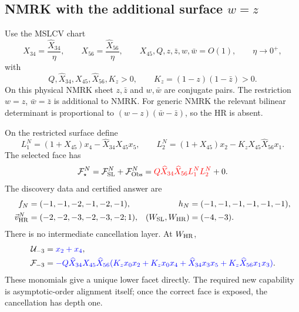 \documentclass[a4paper,11pt]{article}
\newcommand{\FSL}{\mathcal F_{\rm SL}}
\newcommand{\FObs}{\mathcal F_{\rm Obs}}
\newcommand{\WSL}{W_{\rm SL}}
\newcommand{\WHR}{W_{\rm HR}}
\newcommand{\vHR}{\vec v_{\rm HR}}
\newcommand{\SLcolour}[1]{{\color{red}#1}}
\newcommand{\HRcolour}[1]{{\color{blue}#1}}
\begin{document}
\subsection{NMRK with the additional surface \texorpdfstring{\(w=z\)}{w=z}}

Use the MSLCV chart
\begin{equation}
 X_{34}=\frac{\widehat X_{34}}{\eta},\qquad
 X_{56}=\frac{\widehat X_{56}}{\eta},\qquad
 X_{45},Q,z,\bar z,w,\bar w=O(1),\qquad \eta\to0^+,
 \label{eq:nmrk-scaling-example}
\end{equation}
with
\begin{equation}
 Q,\widehat X_{34},X_{45},\widehat X_{56},K_z>0,\qquad
 K_z=(1-z)(1-\bar z)>0.
 \label{eq:nmrk-domain-example}
\end{equation}
On this physical NMRK sheet \(z,\bar z\) and \(w,\bar w\) are conjugate
pairs.  The restriction \(w=z\), \(\bar w=\bar z\) is additional to NMRK.
For generic NMRK the relevant bilinear determinant is proportional to
\((w-z)(\bar w-\bar z)\), so the HR is absent.

On the restricted surface define
\begin{equation}
 L_1^N=(1+X_{45})x_4-\widehat X_{34}X_{45}x_5,\qquad
 L_2^N=(1+X_{45})x_2-K_zX_{45}\widehat X_{56}x_1.
 \label{eq:nmrk-factors-example}
\end{equation}
The selected face has
\begin{equation}
 \mathcal F_\star^N=\FSL^N+\FObs^N
 =\SLcolour{Q\widehat X_{34}\widehat X_{56}L_1^NL_2^N}+0.
 \label{eq:nmrk-decomposition-example}
\end{equation}
The discovery data and certified answer are
\begin{align}
 f_N&=(-1,-1,-2,-1,-2,-1),&
 h_N&=(-1,-1,-1,-1,-1,-1),\nonumber\\
 \vHR^N&=(-2,-2,-3,-2,-3,-2;1),&
 (\WSL,\WHR)&=(-4,-3).
 \label{eq:nmrk-vector-example}
\end{align}
There is no intermediate cancellation layer.  At \(\WHR\),
\begin{align}
 \mathcal U_{-3}&=\HRcolour{x_2+x_4},\nonumber\\
 \mathcal F_{-3}&=\HRcolour{-Q\widehat X_{34}X_{45}\widehat X_{56}
 (K_zx_0x_2+K_zx_0x_4+\widehat X_{34}x_3x_5
 +K_z\widehat X_{56}x_1x_3)}.
 \label{eq:nmrk-WHR-example}
\end{align}
These monomials give a unique lower facet directly.  The required new
capability is asymptotic-order alignment itself; once the correct face is
exposed, the cancellation has depth one.
\end{document}
